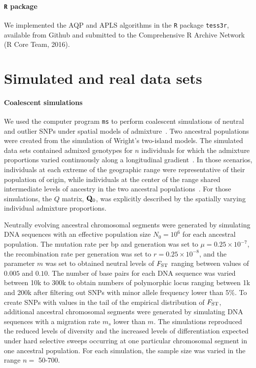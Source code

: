 \paragraph{{\tt R} package} We implemented the AQP and APLS algorithms in the {\tt R} package {\tt tess3r}, available from Github and submitted to the Comprehensive R Archive Network (R Core Team, 2016).  


\section{Simulated and real data sets}
\paragraph{Coalescent simulations} We used the computer program {\tt ms} to perform coalescent simulations of neutral and outlier SNPs under spatial models of admixture~\citep{Hudson2002}. Two ancestral populations were created from the simulation of Wright\rq{}s two-island models. The simulated data sets contained admixed genotypes for $n$ individuals for which the admixture proportions varied continuously along a longitudinal gradient~\citep{Durand2009, Francois2010}. In those scenarios, individuals at each extreme of the geographic range were representative of their population of origin, while individuals at the center of the range shared intermediate levels of ancestry in the two ancestral populations~\citep{Caye2016}. For those simulations, the $Q$ matrix, ${\bf Q}_0$, was explicitly described by the spatially varying individual admixture proportions.


Neutrally evolving ancestral chromosomal segments were generated by simulating DNA sequences with an effective  population size $N_0 = 10^6$ for each ancestral population. The mutation rate per bp and generation was set to $\mu = 0.25 \times 10^{-7}$, the recombination rate per generation was set to $r = 0.25 \times 10^{-8}$, and the parameter $m$ was set to obtained neutral levels of $F_{\rm ST}$ ranging between values of $0.005$ and $0.10$. The number of base pairs for each DNA sequence was varied between 10k to 300k to obtain numbers of polymorphic locus ranging between 1k and 200k after filtering out SNPs with minor allele frequency lower than 5$\%$.  To create SNPs with values in the tail of the empirical distribution of $F_{\rm ST}$,  additional ancestral chromosomal segments were generated by simulating DNA sequences with a migration rate $m_s$ lower than $m$. The simulations reproduced the reduced levels of diversity and the increased levels of differentiation expected under hard selective sweeps occurring at one particular chromosomal segment in one ancestral population.  For each simulation, the sample size  was varied in the range $n =$ 50-700.


